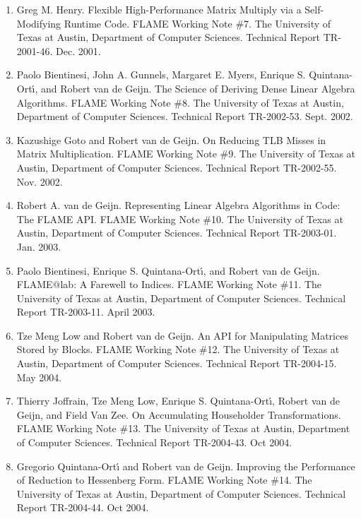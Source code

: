 \begin{enumerate}
\item
      Greg M. Henry. Flexible High-Performance Matrix Multiply via a
      Self-Modifying Runtime Code. FLAME Working Note \#7. The
      University of Texas at Austin, Department of Computer
      Sciences. Technical Report TR-2001-46. Dec. 2001.

\item
      Paolo Bientinesi, John A. Gunnels, Margaret E. Myers, Enrique
      S. Quintana-Ort\'{\i}, and Robert van de Geijn. The Science of
      Deriving Dense Linear Algebra Algorithms. FLAME Working Note
      \#8. The University of Texas at Austin, Department of Computer
      Sciences. Technical Report TR-2002-53. Sept. 2002.

\item
      Kazushige Goto and Robert van de Geijn. On Reducing TLB Misses
      in Matrix Multiplication. FLAME Working Note \#9. The University
      of Texas at Austin, Department of Computer Sciences. Technical
      Report TR-2002-55. Nov. 2002.

\item
      Robert A. van de Geijn. Representing Linear Algebra Algorithms in Code: The FLAME API. FLAME Working Note \#10. The University of Texas at Austin, Department of Computer Sciences. Technical Report TR-2003-01. Jan. 2003.

\item
      Paolo Bientinesi, Enrique S. Quintana-Ort\'{\i}, and Robert van de Geijn. FLAME@lab: A Farewell to Indices. FLAME Working Note \#11. The University of Texas at Austin, Department of Computer Sciences. Technical Report TR-2003-11. April 2003.

\item
      Tze Meng Low and Robert van de Geijn. An API for Manipulating Matrices Stored by Blocks. FLAME Working Note \#12. The University of Texas at Austin, Department of Computer Sciences. Technical Report TR-2004-15. May 2004.

\item
      Thierry Joffrain, Tze Meng Low, Enrique S. Quintana-Ort\'{\i}, Robert van de Geijn, and Field Van Zee. On Accumulating Householder Transformations. FLAME Working Note \#13. The University of Texas at Austin, Department of Computer Sciences. Technical Report TR-2004-43. Oct 2004.

\item
      Gregorio Quintana-Ort\'{\i} and Robert van de Geijn. Improving the Performance of Reduction to Hessenberg Form. FLAME Working Note \#14. The University of Texas at Austin, Department of Computer Sciences. Technical Report TR-2004-44. Oct 2004.


\end{enumerate}
